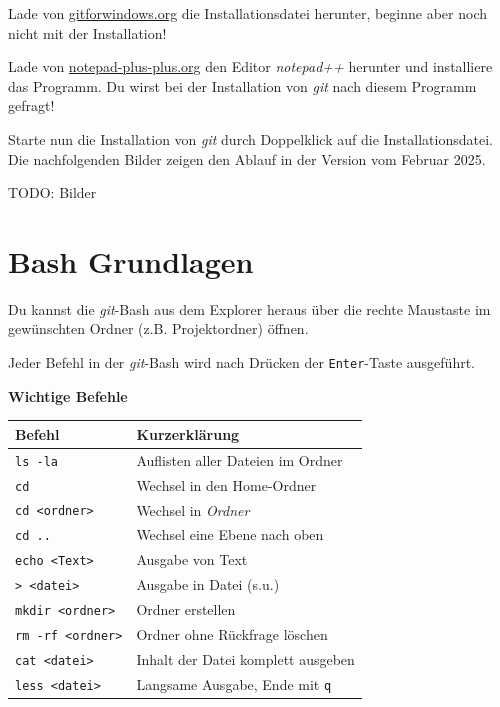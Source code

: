 \documentclass[
  letterpaper,
  DIV=11]{scrreprt}
\newcommand{\key}[1]{\texttt{#1}\xspace}
\newcommand{\git}{\textit{git}\xspace}
\begin{document}
Lade von \href{https://gitforwindows.org}{gitforwindows.org} die
Installationsdatei herunter, beginne aber noch nicht mit der
Installation!

Lade von
\href{https://notepad-plus-plus.org/downloads/}{notepad-plus-plus.org}
den Editor \emph{notepad++} herunter und installiere das Programm. Du
wirst bei der Installation von \git nach diesem Programm gefragt!

Starte nun die Installation von \git durch Doppelklick auf die
Installationsdatei. Die nachfolgenden Bilder zeigen den Ablauf in der
Version vom Februar 2025.

TODO: Bilder

\section{Bash Grundlagen}\label{bash-grundlagen}

Du kannst die \git-Bash aus dem Explorer heraus über die rechte
Maustaste im gewünschten Ordner (z.B. Projektordner) öffnen.

Jeder Befehl in der \git-Bash wird nach Drücken der \key{Enter}-Taste
ausgeführt.

\textbf{Wichtige Befehle}

\begin{longtable}[]{@{}ll@{}}
\toprule\noalign{}
Befehl & Kurzerklärung \\
\midrule\noalign{}
\endhead
\bottomrule\noalign{}
\endlastfoot
\texttt{ls\ -la} & Auflisten aller Dateien im Ordner \\
\texttt{cd} & Wechsel in den Home-Ordner \\
\texttt{cd\ \textless{}ordner\textgreater{}} & Wechsel in
\emph{Ordner} \\
\texttt{cd\ ..} & Wechsel eine Ebene nach oben \\
\texttt{echo\ \textless{}Text\textgreater{}} & Ausgabe von Text \\
\texttt{\textgreater{}\ \textless{}datei\textgreater{}} & Ausgabe in
Datei (s.u.) \\
\texttt{mkdir\ \textless{}ordner\textgreater{}} & Ordner erstellen \\
\texttt{rm\ -rf\ \textless{}ordner\textgreater{}} & Ordner ohne
Rückfrage löschen \\
\texttt{cat\ \textless{}datei\textgreater{}} & Inhalt der Datei komplett
ausgeben \\
\texttt{less\ \textless{}datei\textgreater{}} & Langsame Ausgabe, Ende
mit \texttt{q} \\
\end{longtable}
\end{document}
